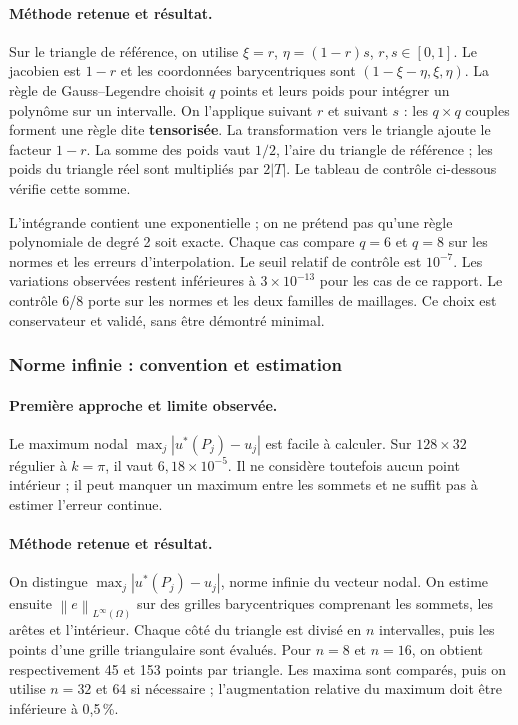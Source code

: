 \documentclass[12pt,a4paper]{article}
\newcommand{\norm}[1]{\left\lVert#1\right\rVert}
\begin{document}
\paragraph{Méthode retenue et résultat.}
Sur le triangle de référence, on utilise $\xi=r$, $\eta=(1-r)s$, $r,s\in[0,1]$. Le jacobien est $1-r$ et les coordonnées barycentriques sont $(1-\xi-\eta,\xi,\eta)$. La règle de Gauss--Legendre choisit $q$ points et leurs poids pour intégrer un polynôme sur un intervalle. On l'applique suivant $r$ et suivant $s$ : les $q\times q$ couples forment une règle dite \textbf{tensorisée}. La transformation vers le triangle ajoute le facteur $1-r$. La somme des poids vaut $1/2$, l'aire du triangle de référence ; les poids du triangle réel sont multipliés par $2|T|$. Le tableau de contrôle ci-dessous vérifie cette somme.

L'intégrande contient une exponentielle ; on ne prétend pas qu'une règle polynomiale de degré 2 soit exacte. Chaque cas compare $q=6$ et $q=8$ sur les normes et les erreurs d'interpolation. Le seuil relatif de contrôle est $10^{-7}$. Les variations observées restent inférieures à $3\times10^{-13}$ pour les cas de ce rapport. Le contrôle 6/8 porte sur les normes et les deux familles de maillages. Ce choix est conservateur et validé, sans être démontré minimal.

\subsubsection{Norme infinie : convention et estimation}
\paragraph{Première approche et limite observée.}
Le maximum nodal $\max_j|u^*(P_j)-u_j|$ est facile à calculer. Sur $128\times32$ régulier à $k=\pi$, il vaut $6,18\times10^{-5}$. Il ne considère toutefois aucun point intérieur ; il peut manquer un maximum entre les sommets et ne suffit pas à estimer l'erreur continue.

\paragraph{Méthode retenue et résultat.}
On distingue $\max_j|u^*(P_j)-u_j|$, norme infinie du vecteur nodal. On estime ensuite $\norm{e}_{L^\infty(\Omega)}$ sur des grilles barycentriques comprenant les sommets, les arêtes et l'intérieur. Chaque côté du triangle est divisé en $n$ intervalles, puis les points d'une grille triangulaire sont évalués. Pour $n=8$ et $n=16$, on obtient respectivement 45 et 153 points par triangle. Les maxima sont comparés, puis on utilise $n=32$ et $64$ si nécessaire ; l'augmentation relative du maximum doit être inférieure à 0,5\,\%.
\end{document}
